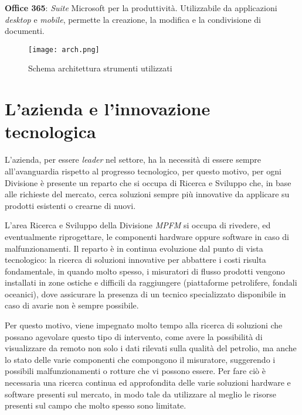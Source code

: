  \textbf{Office 365}:  \textit{Suite} Microsoft per la produttività. Utilizzabile da applicazioni \textit{desktop} e \textit{mobile}, permette la creazione, la modifica e la condivisione di documenti.	

\begin{figure}[H]
  \centering
  \texttt{[image: arch.png]}
  \caption{Schema architettura strumenti utilizzati}
\end{figure}


\section{L'azienda e l'innovazione tecnologica}

L'azienda, per essere \textit{leader} nel settore, ha la necessità di essere sempre all'avanguardia rispetto al progresso tecnologico, per questo motivo, per ogni Divisione è presente un reparto che si occupa di Ricerca e Sviluppo che, in base alle richieste del mercato, cerca soluzioni sempre più innovative da applicare su prodotti esistenti o crearne di nuovi.

L'area Ricerca e Sviluppo della Divisione \textit{MPFM} si occupa di rivedere, ed eventualmente riprogettare, le componenti hardware oppure software in caso di malfunzionamenti. Il reparto è in continua evoluzione dal punto di vista tecnologico: la ricerca di soluzioni innovative per abbattere i costi risulta fondamentale, in quando molto spesso, i misuratori di flusso prodotti vengono installati in zone ostiche e difficili da raggiungere (piattaforme petrolifere, fondali oceanici), dove assicurare la presenza di un tecnico specializzato disponibile in caso di avarie non è sempre possibile.

Per questo motivo, viene impegnato molto tempo alla ricerca di soluzioni che possano agevolare questo tipo di intervento, come avere la possibilità di visualizzare da remoto non solo i dati rilevati sulla qualità del petrolio, ma anche lo stato delle varie componenti che compongono il misuratore, suggerendo i possibili malfunzionamenti o rotture che vi possono essere. Per fare ciò è necessaria una ricerca continua ed approfondita delle varie soluzioni hardware e software presenti sul mercato, in modo tale da utilizzare al meglio le risorse presenti sul campo che molto spesso sono limitate.

